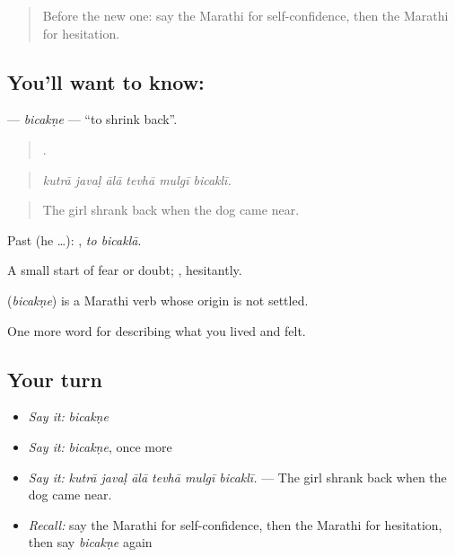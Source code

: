 \label{lesson:MR-C456-bicakne}



\begin{quote}
Before the new one: say the Marathi for self-confidence, then the Marathi for hesitation.
\end{quote}

\subsection*{You'll want to know: }
\textbf{} — \emph{bicakṇe} — \textquotedblleft{}to shrink back\textquotedblright{}.

\begin{quote}
     .
\end{quote}

\begin{quote}
\emph{kutrā javaḷ ālā tevhā mulgī bicaklī.}
\end{quote}

\begin{quote}
The girl shrank back when the dog came near.
\end{quote}

Past (he …):  , \emph{to bicaklā}.

A small start of fear or doubt;  , hesitantly.

\begin{cousinweb}
\textbf{} (\emph{bicakṇe}) is a Marathi verb whose origin is not settled.
\end{cousinweb}

\begin{grammarlens}[title={What you've built}]
One more word for describing what you lived and felt.
\end{grammarlens}

\subsection*{Your turn}
\begin{itemize}
\raggedright
  \item \emph{Say it:} \emph{bicakṇe}
  \item \emph{Say it:} \emph{bicakṇe}, once more
  \item \emph{Say it:} \emph{kutrā javaḷ ālā tevhā mulgī bicaklī.} — The girl shrank back when the dog came near.
  \item \emph{Recall:} say the Marathi for self-confidence, then the Marathi for hesitation, then say \emph{bicakṇe} again
\end{itemize}

